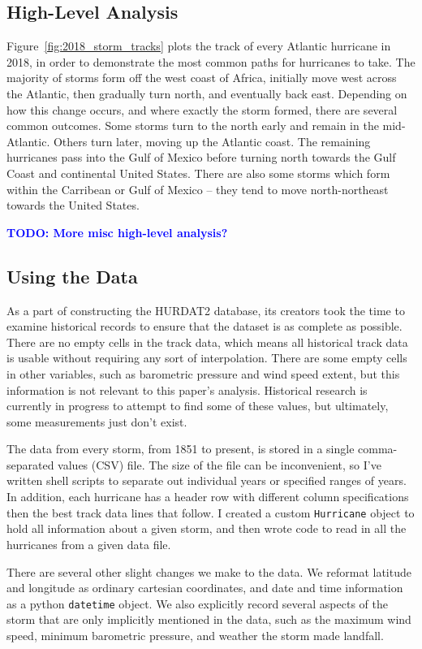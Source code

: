 \subsection{High-Level Analysis}

\par
Figure~\ref{fig:2018_storm_tracks} plots the track of every Atlantic hurricane in 2018, in order to demonstrate the most common paths for hurricanes to take.
The majority of storms form off the west coast of Africa, initially move west across the Atlantic, then gradually turn north, and eventually back east.
Depending on how this change occurs, and where exactly the storm formed, there are several common outcomes.
Some storms turn to the north early and remain in the mid-Atlantic.
Others turn later, moving up the Atlantic coast.
The remaining hurricanes pass into the Gulf of Mexico before turning north towards the Gulf Coast and continental United States.
There are also some storms which form within the Carribean or Gulf of Mexico -- they tend to move north-northeast towards the United States.

\par
\textcolor{blue}{\textbf{TODO: More misc high-level analysis?}}

\subsection{Using the Data}

\par
As a part of constructing the HURDAT2 database, its creators took the time to examine historical records to ensure that the dataset is as complete as possible.
There are no empty cells in the track data, which means all historical track data is usable without requiring any sort of interpolation.
There are some empty cells in other variables, such as barometric pressure and wind speed extent, but this information is not relevant to this paper's analysis.
Historical research is currently in progress to attempt to find some of these values, but ultimately, some measurements just don't exist.

\par
The data from every storm, from 1851 to present, is stored in a single comma-separated values (CSV) file.
The size of the file can be inconvenient, so I've written shell scripts to separate out individual years or specified ranges of years.
In addition, each hurricane has a header row with different column specifications then the best track data lines that follow.
I created a custom \texttt{Hurricane} object to hold all information about a given storm, and then wrote code to read in all the hurricanes from a given data file.

\par
There are several other slight changes we make to the data.
We reformat latitude and longitude as ordinary cartesian coordinates, and date and time information as a python \texttt{datetime} object.
We also explicitly record several aspects of the storm that are only implicitly mentioned in the data, such as the maximum wind speed, minimum barometric pressure, and weather the storm made landfall.
